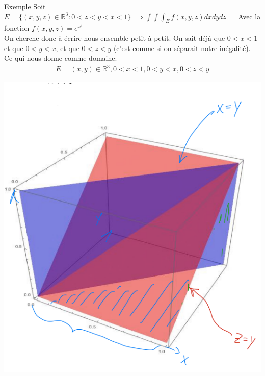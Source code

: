 \begin{parag}{Exemple}
	Soit $E = \{\left(x, y, z\right) \in \mathbb{R}^{3}: 0 < z < y < x < 1\} \implies \int\int\int_E f\left(x, y, z\right)dxdydz =$  Avec la fonction $f\left(x, y, z\right) = e^{x^3}$\\
	On cherche donc à écrire nous ensemble petit à petit. On sait déjà que $0 < x < 1$ et que $0 < y < x$, et que $0 < z < y$ (c'est comme si on séparait notre inégalité).
	Ce qui nous donne comme domaine:
	\begin{align*} E = {(x, y) \in \mathbb{R}^{3}, 0 < x < 1, 0 < y < x, 0 < z < y} \end{align*}
	\begin{center}
	    \includegraphics[scale=0.8]{12025-05-19.png}
	\end{center}
	


\end{parag}
